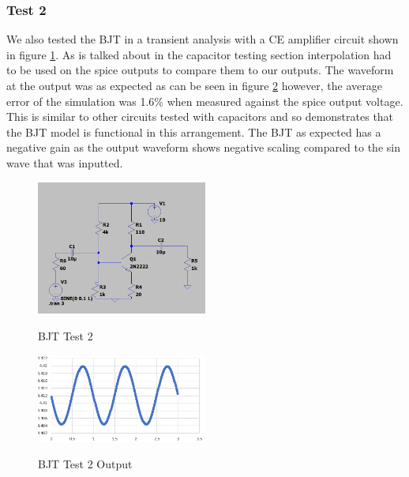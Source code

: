 \documentclass{article}
\begin{document}
\subsubsection{Test 2}
We also tested the BJT in a transient analysis with a CE amplifier circuit shown in figure \ref{fig:BJTTest2}. As is talked about in the capacitor testing section interpolation had to be used on the spice outputs to compare them to our outputs. The waveform at the output was as expected as can be seen in figure \ref{fig:BJTOutput2} however, the average error of the simulation was 1.6\% when measured against the spice output voltage. This is similar to other circuits tested with capacitors and so demonstrates that the BJT model is functional in this arrangement. The BJT as expected has a negative gain as the output waveform shows negative scaling compared to the sin wave that was inputted. 
\begin{figure}[h]
    \caption{BJT Test 2}
    \centering
    \includegraphics[width=0.5\textwidth]{images/BJTTest2.png}
    \label{fig:BJTTest2}
\end{figure}
\begin{figure}[h]
    \caption{BJT Test 2 Output}
    \centering
    \includegraphics[width=0.5\textwidth]{images/BJTOutput2.png}
    \label{fig:BJTOutput2}
\end{figure}
\newpage
\end{document}
